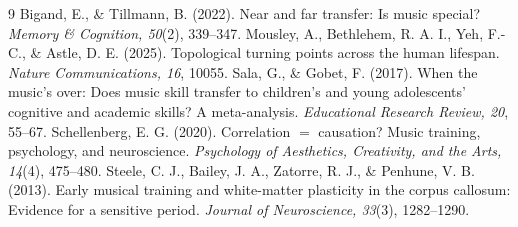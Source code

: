 \documentclass[11pt]{article}
\begin{document}
\begin{thebibliography}{9}
 Bigand, E., \& Tillmann, B. (2022). Near and far transfer: Is music special? \emph{Memory \& Cognition, 50}(2), 339--347.
 Mousley, A., Bethlehem, R. A. I., Yeh, F.-C., \& Astle, D. E. (2025). Topological turning points across the human lifespan. \emph{Nature Communications, 16}, 10055.
 Sala, G., \& Gobet, F. (2017). When the music's over: Does music skill transfer to children's and young adolescents' cognitive and academic skills? A meta-analysis. \emph{Educational Research Review, 20}, 55--67.
 Schellenberg, E. G. (2020). Correlation $=$ causation? Music training, psychology, and neuroscience. \emph{Psychology of Aesthetics, Creativity, and the Arts, 14}(4), 475--480.
 Steele, C. J., Bailey, J. A., Zatorre, R. J., \& Penhune, V. B. (2013). Early musical training and white-matter plasticity in the corpus callosum: Evidence for a sensitive period. \emph{Journal of Neuroscience, 33}(3), 1282--1290.
\end{thebibliography}
\end{document}
